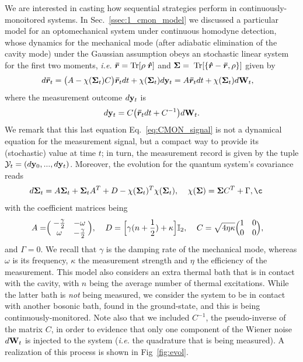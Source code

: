 We are interested in casting how sequential strategies perform in continuously-monoitored systems. In Sec.~\ref{ssec:1_cmon_model} we discussed a particular model for an optomechanical system under continuous homodyne detection, whose dynamics for the mechanical mode (after adiabatic elimination of the cavity mode) under the Gaussian assumption obeys an stochastic linear system for the first two moments, \textit{i.e.} $\bm{\bar{r}} = \text{Tr}[\rho \; \bm{\hat{r}}]$ and $\bm{\Sigma} = \; \text{Tr}[\lbrace \bm{\hat{r}} - \bm{\bar{r}}, \rho\rbrace]$ given by
\begin{align}\label{eq:cmon_LINEALSYSTEM}
d\bm{\bar{r}}_t &= \big(A - \chi(\bm{\Sigma}_t) C\big) \bm{\bar{r}}_t dt + \chi(\bm{\Sigma}_t) d\mathbf{y}_t = A \bm{\bar{r}}_t dt + \chi(\bm{\Sigma}_t) d\mathbf{W}_t,
\end{align}
where the measurement outcome $d\mathbf{y}_t$ is
\begin{align}\label{eq:CMON_signal}
d\mathbf{y}_t = C \big(\bm{\bar{r}}_t dt + C^{-1}\big)d\mathbf{W}_t.
\end{align}
We remark that this last equation Eq.~\ref{eq:CMON_signal} is not a dynamical equation for the measurement signal, but a compact way to provide its (stochastic) value at time $t$; in turn, the measurement record is given by the tuple $\mathcal{Y}_t = (d\mathbf{y}_0,...,d\mathbf{y}_t)$. Moreover, the evolution for the quantum system's covariance reads
\begin{align}\label{eq:cmon_rica2}
d\cov_t &= A \cov_t + \cov_t A^T + D - \chi(\cov_t)^T \chi(\cov_t), \spacee \chi(\cov) = \cov C^T + \Gamma, \nonumber¸
\end{align}
with the coefficient matrices being
\begin{align}%
A =& \Big(\;\begin{matrix}-\frac{\gamma}{2}& -\omega\\\omega & -\frac{\gamma}{2}\end{matrix}\;\Big), \spacee
D = \Big[\gamma (n + \frac{1}{2}) + \kappa \Big]\mathbb{I}_2, \spacee  C = \sqrt{4 \eta \kappa} \Big(\begin{matrix}1&0\\0&0\end{matrix}\Big),
\end{align}
and $\Gamma=0$. We recall that $\gamma$ is the damping rate of the mechanical mode, whereas $\omega$ is its frequency, $\kappa$ the measurement strength and $\eta$ the efficiency of the measurement. This model also considers an extra thermal bath that is in contact with the cavity, with $n$ being the average number of thermal excitations. While the latter bath is \textit{not} being measured, we consider the system to be in contact with another bosonic bath, found in the ground-state, and this is being continuously-monitored. Note also that we included $C^{-1}$, the pseudo-inverse of the matrix $C$, in order to evidence that only one component of the Wiener noise $d\mathbf{W}_t$ is injected to the system (\textit{i.e.} the quadrature that is being measured). A realization of this process is shown in Fig~\ref{fig:evol}.

